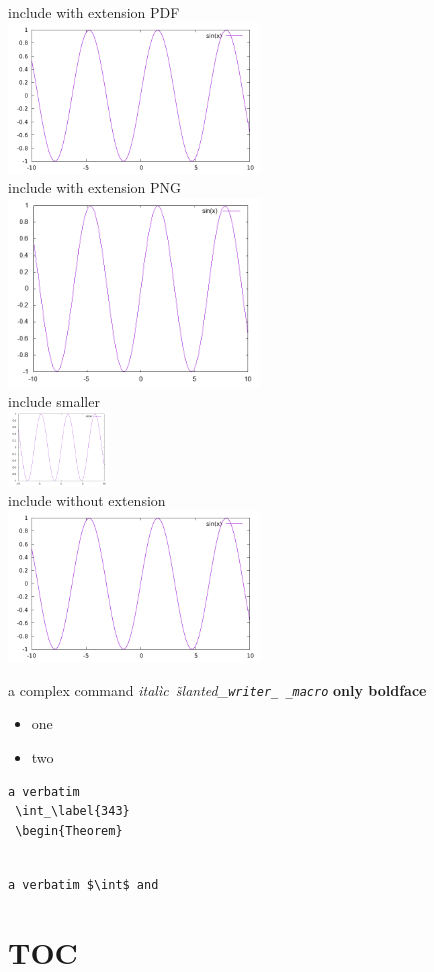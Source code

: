 \documentclass[a4paper]{article}
\newcounter{myCount}
\newtheorem{Theorem}%
[myCount]{Teorema}
\begin{document}
\begin{center}
  include with extension PDF
  \\
  \includegraphics[width=0.5\textwidth]{F/sin.pdf}
  \\
  include with extension PNG
  \\
  \includegraphics[width=0.5\textwidth]{F/sin.png}
  \\
  include smaller
  \\
  \includegraphics[width=0.2\textwidth]{F/sin.png}
  \\
  include without extension
  \\
  \includegraphics[width=0.5\textwidth]{F/sin}
\end{center}


a complex command
\emph{ital\`ic\textsl{~\~slanted\_\texttt{writer\_%
      \_macro}}}
\textbf{only boldface}

\begin{itemize}%


\item one
\item two
\end{itemize}


\begin{verbatim}
a verbatim
 \int_\label{343}
 \begin{Theorem}


\end{verbatim}

\verb=a verbatim $\int$ and  =

%

%

\section*{TOC}

\tableofcontents
\end{document}
